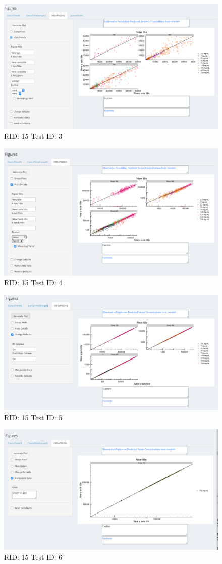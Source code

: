 \begin{figure}[H]
\includegraphics[width=.8\textwidth]{screencaps/15-3-1.png}
\caption{RID: 15 Test ID: 3}
\end{figure}
\begin{figure}[H]
\includegraphics[width=.8\textwidth]{screencaps/15-4-1.png}
\caption{RID: 15 Test ID: 4}
\end{figure}
\begin{figure}[H]
\includegraphics[width=.8\textwidth]{screencaps/15-5-1.png}
\caption{RID: 15 Test ID: 5}
\end{figure}
\begin{figure}[H]
\includegraphics[width=.8\textwidth]{screencaps/15-6-1.png}
\caption{RID: 15 Test ID: 6}
\end{figure}
